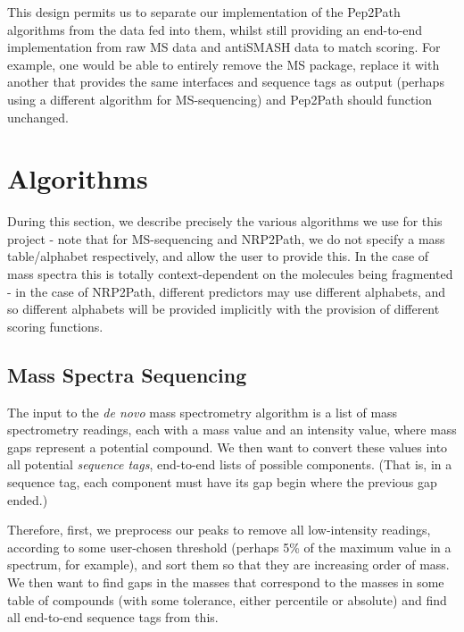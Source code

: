 \documentclass{l4proj}
\begin{document}
This design permits us to separate our implementation of the Pep2Path algorithms from the data fed into them, whilst still providing an end-to-end implementation from raw MS data and antiSMASH data to match scoring. For example, one would be able to entirely remove the MS package, replace it with another that provides the same interfaces and sequence tags as output (perhaps using a different algorithm for MS-sequencing) and Pep2Path should function unchanged.

\section{Algorithms}

During this section, we describe precisely the various algorithms we use for this project - note that for MS-sequencing and NRP2Path, we do not specify a mass table/alphabet respectively, and allow the user to provide this. In the case of mass spectra this is totally context-dependent on the molecules being fragmented - in the case of NRP2Path, different predictors may use different alphabets, and so different alphabets will be provided implicitly with the provision of different scoring functions.

\subsection{Mass Spectra Sequencing}

The input to the \textit{de novo} mass spectrometry algorithm is a list of mass spectrometry readings, each with a mass value and an intensity value, where mass gaps represent a potential compound. We then want to convert these values into all potential \textit{sequence tags}, end-to-end lists of possible components. (That is, in a sequence tag, each component must have its gap begin where the previous gap ended.) 

Therefore, first, we preprocess our peaks to remove all low-intensity readings, according to some user-chosen threshold (perhaps 5\% of the maximum value in a spectrum, for example), and sort them so that they are increasing order of mass. We then want to find gaps in the masses that correspond to the masses in some table of compounds (with some tolerance, either percentile or absolute) and find all end-to-end sequence tags from this.
\end{document}
